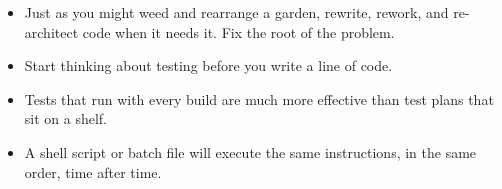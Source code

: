 \begin{itemize}
  \item {}
    Just as you might weed and rearrange a garden, rewrite, rework, and re-architect code when it needs it. Fix the root of the problem.
    \newslide
  \item {}
    Start thinking about testing before you write a line of code.
  \item {}
    Tests that run with every build are much more effective than test plans that sit on a shelf.
%


  \item {}
    A shell script or batch file will execute the same instructions, in the same order, time after time.




\end{itemize}
